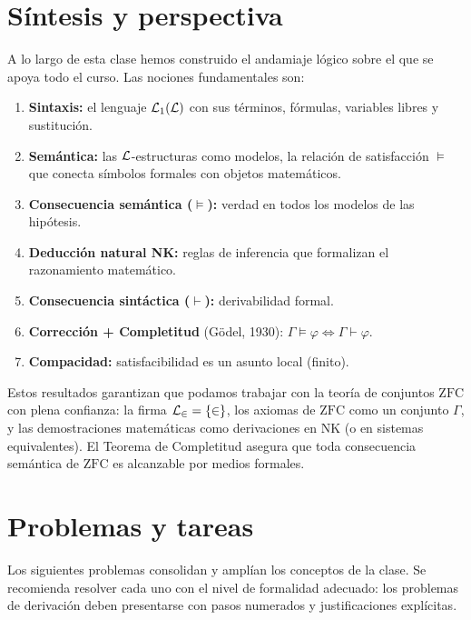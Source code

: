 \section{Síntesis y perspectiva}

A lo largo de esta clase hemos construido el andamiaje lógico sobre el que se apoya todo el curso. Las nociones fundamentales son:

\begin{enumerate}[leftmargin=2em, label=\textbf{\arabic*.}]
  \item \textbf{Sintaxis:} el lenguaje $\mathcal{L}_1(\mathcal{L})$ con sus términos, fórmulas, variables libres y sustitución.
  \item \textbf{Semántica:} las $\mathcal{L}$-estructuras como modelos, la relación de satisfacción $\models$ que conecta símbolos formales con objetos matemáticos.
  \item \textbf{Consecuencia semántica ($\models$):} verdad en todos los modelos de las hipótesis.
  \item \textbf{Deducción natural NK:} reglas de inferencia que formalizan el razonamiento matemático.
  \item \textbf{Consecuencia sintáctica ($\vdash$):} derivabilidad formal.
  \item \textbf{Corrección + Completitud} (Gödel, 1930): $\Gamma \models \varphi \iff \Gamma \vdash \varphi$.
  \item \textbf{Compacidad:} satisfacibilidad es un asunto local (finito).
\end{enumerate}

Estos resultados garantizan que podamos trabajar con la teoría de conjuntos $\mathrm{ZFC}$ con plena confianza: la firma $\mathcal{L}_\in = \{\in\}$, los axiomas de $\mathrm{ZFC}$ como un conjunto $\Gamma$, y las demostraciones matemáticas como derivaciones en NK (o en sistemas equivalentes). El Teorema de Completitud asegura que toda consecuencia semántica de $\mathrm{ZFC}$ es alcanzable por medios formales.

\section{Problemas y tareas}

Los siguientes problemas consolidan y amplían los conceptos de la clase. Se recomienda resolver cada uno con el nivel de formalidad adecuado: los problemas de derivación deben presentarse con pasos numerados y justificaciones explícitas.

